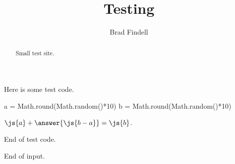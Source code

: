 \documentclass[nooutcomes]{ximera}
\title{Testing}
\author{Brad Findell}
\begin{document}
\begin{abstract}
Small test site.
\end{abstract}
\maketitle

Here is some test code. 

    \begin{javascript}
      a = Math.round(Math.random()*10)
      b = Math.round(Math.random()*10)
    \end{javascript}
    
    \begin{problem}
      $\js{a} + \answer{\js{b-a}} = \js{b}$.
    \end{problem}
End of test code. 



End of input. 
\end{document}
